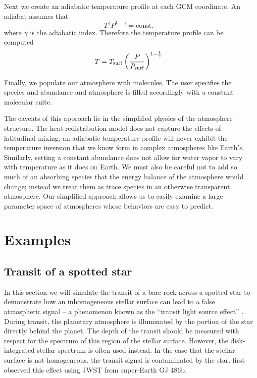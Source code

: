 \documentclass[twocolumn]{aastex631}
\begin{document}
Next we create an adiabatic temperature profile at each GCM coordinate. An adiabat assumes that
\begin{equation}
    T^\gamma P^{1 - \gamma} = \text{const.}
\end{equation}
where $\gamma$ is the adiabatic index. Therefore the temperature profile can be computed
\begin{equation}
    T = T_{\rm surf} \left(\frac{P}{P_{\rm surf}} \right)^{1 - \frac{1}{\gamma} }
\end{equation}

Finally, we populate our atmosphere with molecules. The user specifies the species and abundance and atmosphere is filled accordingly with a constant molecular suite.

The caveats of this approach lie in the simplified physics of the atmosphere structure. The heat-redistribution model does not
capture the effects of latitudinal mixing; an adiabatic temperature profile will never exhibit the temperature inversion
that we know form in complex atmospheres like Earth's. Similarly, setting a constant abundance does not allow for water vapor to
vary with temperature as it does on Earth. We must also be careful not to add so much of an absorbing species that the energy balance of
the atmosphere would change; instead we treat them as trace species in an otherwise transparent atmosphere. Our simplified approach
allows us to easily examine a large parameter space of atmospheres whose behaviors are easy to predict.

\section{Examples \label{sec:examples}}

\subsection{Transit of a spotted star}

In this section we will simulate the transit of a bare rock across a spotted star to demonstrate how an inhomogeneous
stellar surface can lead to a false atmospheric signal -- a phenomenon known as the ``transit light source effect'' \citep{rackham2018}.
During transit, the planetary atmosphere is illuminated by the portion of the star directly behind the planet. The depth of the transit
should be measured with respect for the spectrum of this region of the stellar surface. However, the disk-integrated stellar spectrum is often used instead.
In the case that the stellar surface is not homogeneous, the transit signal is contaminated by the star.
\citet{moran2023} first observed this effect using JWST from super-Earth GJ 486b.
\end{document}
